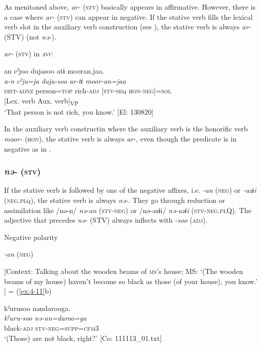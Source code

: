 As menitoned above, \textit{ar-} (\textsc{stv}) basically appears in affirmative. However, there is a case where \textit{ar-} (\textsc{stv}) can appear in negative. If the stative verb fills the lexical verb slot in the auxiliary verb construction (see ), the stative verb is always \textit{ar-} (STV) (not \textit{nə-}).

\ea\label{ex:8-48}
  \textit{ar-} (\textsc{stv}) in \textsc{avc}

  {\TM}
\glll  an  cˀjoo  dujasoo  atɨ  mooran.jaa.\\
\textit{a-n}  \textit{cˀju=ja}  \textit{duja-soo}  \textit{ar-tɨ  moor-an=jaa}\\
    \textsc{dist}-\textsc{adnz}  person=\textsc{top}  rich-\textsc{adj}  [\textsc{stv}-\textsc{seq}  \textsc{hon}-\textsc{neg}]=\textsc{sol}\\
          {}[Lex. verb  Aux. verb]\textsubscript{VP}\\
\glt ‘That person is not rich, you know.’ [El: 130820]
\z


In the auxiliary verb constructin where the auxiliary verb is the honorific verb \textit{moor-} (\textsc{hon}), the stative verb is always \textit{ar-}, even though the predicate is in negative as in .

\subsubsection{\textit{nə-} (\textsc{stv})}

If the stative verb is followed by one of the negative affixes, i.e. \textit{-an} (\textsc{neg}) or \textit{-azɨi} (\textsc{neg}.\textsc{plq}), the stative verb is always \textit{nə-}. They go through reduction or assimilation like /nə-n/ \textit{nə-an} (\textsc{stv}-\textsc{neg}) or /nə-əzɨi/ \textit{nə-azɨi} (\textsc{stv}-\textsc{neg}.\textsc{pl}Q). The adjective that precedes \textit{nə-} (STV) always inflects with \textit{-soo} (\textsc{adj}).

\ea\label{ex:8-49}
  Negative polarity

\ea
\textit{-an} (\textsc{neg})

    [Context: Talking about the wooden beams of \textsc{ms}’s house; MS: ‘(The wooden beams of my house) haven’t become so black as those (of your house), you know.’ ] = (\ref{ex:4-11}b)

{\TM}
\glll  kˀurusoo  nəndarooga.\\
\textit{kˀuru-soo}  \textit{nə-an=daroo=ga}\\
black-\textsc{adj}  \textsc{stv}-\textsc{neg}=\textsc{supp}=\textsc{cfm3}\\
\glt ‘(Those) are not black, right?’ [Co: 111113\_01.txt]

